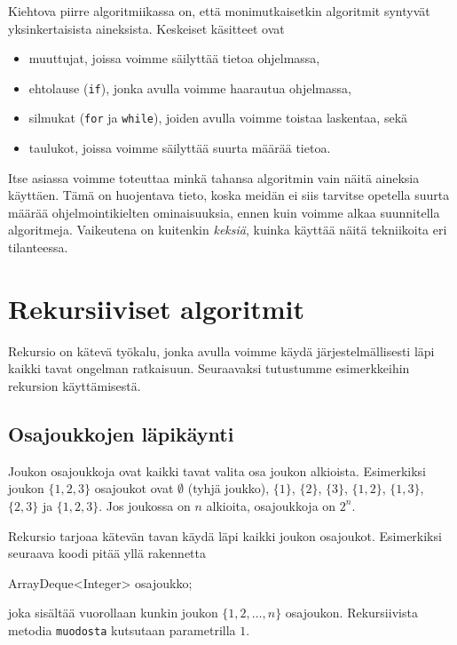 Kiehtova piirre algoritmiikassa on, että monimutkaisetkin algoritmit
syntyvät yksinkertaisista aineksista. Keskeiset käsitteet ovat

\begin{itemize}
\item muuttujat, joissa voimme säilyttää tietoa ohjelmassa,
\item ehtolause (\texttt{if}), jonka avulla voimme haarautua ohjelmassa,
\item silmukat (\texttt{for} ja \texttt{while}), joiden avulla voimme
toistaa laskentaa, sekä
\item taulukot, joissa voimme säilyttää suurta määrää tietoa.
\end{itemize}

Itse asiassa voimme toteuttaa minkä tahansa algoritmin vain näitä
aineksia käyttäen.
Tämä on huojentava tieto, koska meidän ei siis tarvitse opetella
suurta määrää ohjelmointikielten ominaisuuksia,
ennen kuin voimme alkaa suunnitella algoritmeja.
Vaikeutena on kuitenkin \emph{keksiä}, kuinka käyttää näitä
tekniikoita eri tilanteessa.

\section{Rekursiiviset algoritmit}

Rekursio on kätevä työkalu, jonka avulla voimme käydä
järjestelmällisesti läpi kaikki tavat ongelman ratkaisuun.
Seuraavaksi tutustumme esimerkkeihin rekursion käyttämisestä.

\subsection{Osajoukkojen läpikäynti}

Joukon osajoukkoja ovat kaikki tavat valita osa joukon alkioista.
Esimerkiksi joukon $\{1,2,3\}$ osajoukot ovat
$\emptyset$ (tyhjä joukko), $\{1\}$, $\{2\}$, $\{3\}$,
$\{1,2\}$, $\{1,3\}$, $\{2,3\}$ ja $\{1,2,3\}$.
Jos joukossa on $n$ alkioita, osajoukkoja on $2^n$.

Rekursio tarjoaa kätevän tavan käydä läpi kaikki
joukon osajoukot. Esimerkiksi seuraava koodi pitää yllä
rakennetta

\begin{code}
ArrayDeque<Integer> osajoukko;
\end{code}

joka sisältää vuorollaan kunkin joukon $\{1,2,\dots,n\}$
osajoukon. Rekursiivista metodia \texttt{muodosta} kutsutaan
parametrilla $1$.


